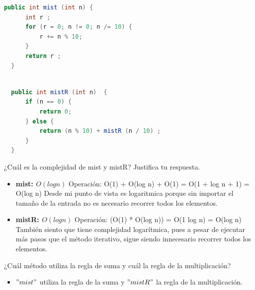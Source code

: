 \documentclass{report}
\begin{document}
\begin{enumerate}
\begin{lstlisting}[language=Java, caption=mist]
  public int mist (int n) {
      int r ;
      for (r = 0; n != 0; n /= 10) {
          r += n % 10;
      }
      return r ;
  }
            \end{lstlisting}
            \begin{lstlisting}[language=Java, caption=mistR]
            
  public int mistR (int n)  {
      if (n == 0) {
          return 0;
      } else {
          return (n % 10) + mistR (n / 10) ;
      }
  }
            \end{lstlisting}
        \newline ¿Cuál es la complejidad de mist y mistR? Justifica tu respuesta.
        \begin{itemize}
            \item \textbf{mist: $O(log n)$}  Operación: O(1) + O(log n) + O(1) = O(1 + log n + 1) = O(log n)  
                \newline Desde mi punto de vista es logaritmica porque sin importar el tamaño de la entrada no es necesario recorrer todos los elementos.
            \item \textbf{mistR: $O(log n) $}  Operación: (O(1) * O(log n)) = O(1 log n) = O(log n)  
                \newline También siento que tiene complejidad logarítmica, pues a pesar de ejecutar más pasos que el método iterativo, sigue siendo innecesario recorrer todos los elementos. 
        \end{itemize}
        \newline ¿Cuál método utiliza la regla de suma y cuál la regla de la multiplicación?
        \begin{itemize} 
            \item $"mist"$ utiliza la regla de la suma y $"mistR"$ la regla de la multiplicación.
        \end{itemize}
    \end{enumerate}
\end{document}
